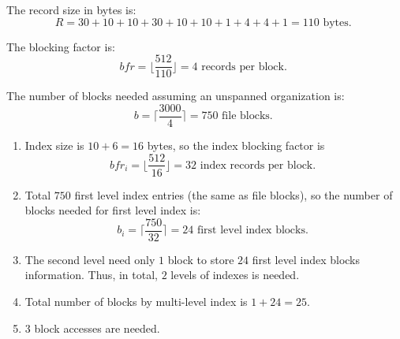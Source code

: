 
\begin{homeworkProblem}
\begin{homeworkSubProblem}
    The record size in bytes is:
    \[R = 30 + 10 + 10 + 30 + 10 + 10 + 1 + 4 + 4 + 1 = 110\text{ bytes. }\]
\end{homeworkSubProblem}

\begin{homeworkSubProblem}
    The blocking factor is:
    \[bfr = \bigg\lfloor\frac{512}{110}\bigg\rfloor = 4\text{ records per block. }\]

    The number of blocks needed assuming an unspanned organization is:
    \[b = \bigg\lceil\frac{3000}{4}\bigg\rceil = 750 \text{ file blocks. }\]
\end{homeworkSubProblem}

\begin{homeworkSubProblem}
    \begin{enumerate}[label=(\roman*)]
        \item Index size is $10+6=16$ bytes, so the index blocking factor is
            \[bfr_i = \bigg\lfloor\frac{512}{16}\bigg\rfloor = 32
            \text{ index records per block. }\]
        \item Total $750$ first level index entries (the same as file blocks),
            so the number of blocks needed for first level index is:
            \[b_i = \bigg\lceil\frac{750}{32}\bigg\rceil = 24 \text{ first level index blocks. }\]
        \item The second level need only $1$ block to store $24$ first level
            index blocks information. Thus, in total, $2$ levels of indexes
            is needed.
        \item Total number of blocks by multi-level index is $1 + 24 = 25$.
        \item $3$ block accesses are needed.
    \end{enumerate}
\end{homeworkSubProblem}


\end{homeworkProblem}
